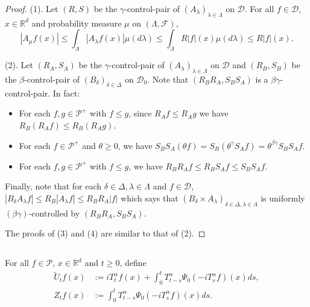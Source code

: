 \documentclass[12pt]{amsart}
\theoremstyle{plain}
\theoremstyle{definition}
\numberwithin{equation}{section}
\begin{document}
\begin{proof}
    (1). Let $(R,S)$ be the $\gamma$-control-pair of $(A_\lambda)_{\lambda\in\Lambda}$ on $\mathcal{D}$. For all $f \in \mathcal{D}$, $x\in \mathbb R^d$ and  probability measure $\mu$ on $(\Lambda, \mathscr F)$,
\[
   |A_{\mu}f(x)|\leq \int_{\Lambda}|A_{\lambda}f(x)|\mu(d\lambda) \leq \int_{\Lambda}R|f|(x)\mu(d\lambda) \leq R|f|(x).
\]

   	(2). Let $(R_A, S_A)$ be the $\gamma$-control-pair of $(A_\lambda)_{\lambda\in\Lambda}$ on $\mathcal{D}$ and $(R_B, S_B)$ be the $\beta$-control-pair of $(B_{\delta})_{\delta\in\Delta}$ on $\mathcal{D}_0$.
	Note that $(R_BR_A, S_BS_A)$ is a $\beta \gamma$-control-pair.
	In fact:
\begin{itemize}
\item
	For each $f,g \in \mathcal P^+$ with $f\leq g$, since $R_Af \leq R_A g$ we have $R_B(R_A f)\leq R_B(R_A g)$.
\item
	For each $f\in \mathcal{P}^+$ and $\theta \geq 0$, we have $S_BS_A(\theta f)=S_B(\theta^{\gamma}S_Af)=\theta^{\beta\gamma}S_BS_Af$.
\item
	For each $f,g \in \mathcal P^+$ with $f\leq g$, we have $R_B R_A f \leq R_B S_A f \leq S_BS_A f$.
\end{itemize}
	Finally, note that for each $\delta\in \Delta, \lambda\in\Lambda$ and $f\in \mathcal D$, $|B_{\delta}A_{\lambda}f|\leq R_B|A_{\lambda}f|\leq R_BR_A|f|$ which says that $(B_\delta\times A_\lambda)_{\delta \in \Delta, \lambda \in \Lambda}$ is uniformly $(\beta\gamma)$-controlled by $(R_BR_A,S_BS_A)$.

   The proofs of (3) and (4) are similar to that of (2). 
\end{proof}
\subsection{}
    For all $f \in \mathcal{P}$, $x\in \mathbb{R}^d$ and $t\geq 0$, define
\begin{align}
\label{eq: def of Zf}
    \tilde U_t f(x)
    &:= i T^\alpha_t f(x) + \int_0^t T^\alpha_{t-s} \Psi_0(-i T_s^{\alpha}f)(x)ds,
    \\Z_t f (x)
    &:= \int_0^t T^\alpha_{t-s} \Psi_0(-i T_s^{\alpha}f)(x)ds.
\end{align}
\end{document}

